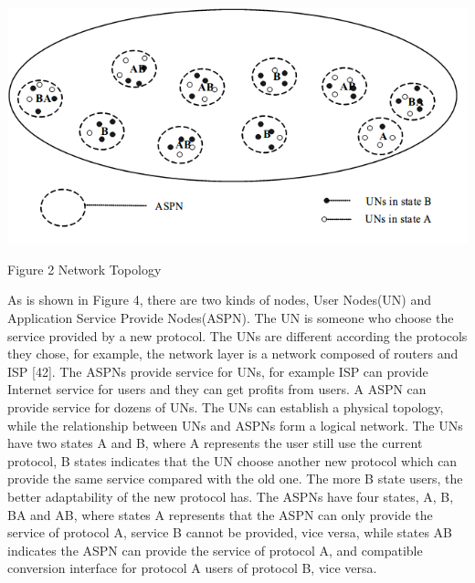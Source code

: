 \documentclass{article}
\begin{document}
\par
\centerline{\includegraphics[width=.5\textwidth]{Figure2.png}}
\centerline{Figure 2 Network Topology}

As is shown in Figure 4, there are two kinds of nodes, User Nodes(UN) and Application Service Provide Nodes(ASPN).
The UN is someone who choose the service provided by a new protocol. The UNs are different according the protocols
they chose, for example, the network layer is a network composed of routers and ISP [42]. The ASPNs provide service
for UNs, for example ISP can provide Internet service for users and they can get profits from users. A ASPN can provide
service for dozens of UNs. The UNs can establish a physical topology, while the relationship between UNs and ASPNs form
a logical network. The UNs have two states A and B, where A represents the user still use the current protocol, B states
indicates that the UN choose another new protocol which can provide the same service compared with the old one. The
more B state users, the better adaptability of the new protocol has. The ASPNs have four states, A, B, BA and AB,
where states A represents that the ASPN can only provide the service of protocol A, service B cannot be provided,
vice versa, while states AB indicates the ASPN can provide the service of protocol A, and compatible conversion
interface for protocol A users of protocol B, vice versa.
\end{document}
